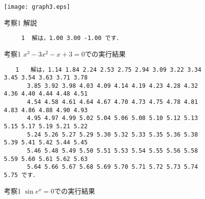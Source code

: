 \documentclass[12pt]{jarticle}
\begin{document}
\begin{figure}[t]
  \center
  \texttt{[image: graph3.eps]}
  \caption{考察1 解説}
  \label{fig:3}
\end{figure}
\begin{figure}[t]
\begin{screen}
\begin{verbatim}
     1	解は，1.00 3.00 -1.00 です．
\end{verbatim}
\end{screen}
\caption{考察1 $x^3-3x^2-x+3=0$での実行結果}
\label{fig:3b}
\begin{screen}
\footnotesize
\begin{verbatim}
　　1　　解は，1.14 1.84 2.24 2.53 2.75 2.94 3.09 3.22 3.34 3.45 3.54 3.63 3.71 3.78
　　　　3.85 3.92 3.98 4.03 4.09 4.14 4.19 4.23 4.28 4.32 4.36 4.40 4.44 4.48 4.51
　　　　4.54 4.58 4.61 4.64 4.67 4.70 4.73 4.75 4.78 4.81 4.83 4.86 4.88 4.90 4.93
　　　　4.95 4.97 4.99 5.02 5.04 5.06 5.08 5.10 5.12 5.13 5.15 5.17 5.19 5.21 5.22
　　　　5.24 5.26 5.27 5.29 5.30 5.32 5.33 5.35 5.36 5.38 5.39 5.41 5.42 5.44 5.45
　　　　5.46 5.48 5.49 5.50 5.51 5.53 5.54 5.55 5.56 5.58 5.59 5.60 5.61 5.62 5.63
　　　　5.64 5.66 5.67 5.68 5.69 5.70 5.71 5.72 5.73 5.74 5.75 です．
\end{verbatim}
\end{screen}
\caption{考察1 $\sin e^x=0$での実行結果}
\label{fig:3c}
\end{figure}
\end{document}
